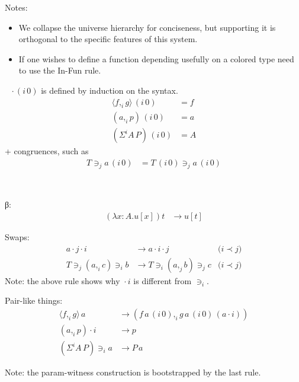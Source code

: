 \documentclass{PaperTools/latex/llncs}
\newcommand\CP[3]{(#2,_{#1} #3)}
\newcommand\param[1]{\!\cdot\!#1}
\newcommand\op[1]{∋_{#1}}
\newcommand\ip[3]{Σ^{#1} {#2}\,{#3}}
\newcommand\fp[3]{⟨#2 ,_{#1} #3⟩}
\newcommand\mor[2]{{#1}\,{#2}}
\newcommand\proj[2]{\mor{#2}{(#1\,0)}}
\newcommand\projp[2]{\proj{#1}{(#2)}}
\newcommand\comment[1]{}
\begin{document}
Notes:

\begin{itemize}
\item We collapse the universe hierarchy for conciseness, but
  supporting it is orthogonal to the specific features of this system.
\item If one wishes to define a function depending usefully on a colored type
  need to use the {\sc In-Fun} rule.
\end{itemize}

\begin{definition}[Projection]~
  $\proj i \cdot$ is defined by induction on the syntax.
\begin{align*}
    \proj i {\fp i f g} & = f \\
  \proj i {(a,_i p)} &= a \\
  \projp i {\ip i A P} &= A
\end{align*}
+ congruences, such as
\begin{align*}
  \proj i {T \op j a} &= {\proj i T \op j \proj i a}
\end{align*}
\end{definition}


\comment{
\begin{definition}[Normal forms and neutral terms]~
  \begin{align*}
    \mathsf{Nf} ∋ u,v,A,B & \coloneqq
      U \mid λx:A. t \mid (x:A) → B \\
      & \mid \CP i u v \mid \fp i u v \\
      & \mid {(\ip {i₀} A B)} \op {i₁} {u_1 \cdots} \op {i_n} {u_n} &\quad \text{($i₀ \prec i₁ \prec \ldots \prec i_n$)} \\
      & \mid s \param {i₀} \cdots \param {i_{n-1}}                  &\quad \text{($i₀ \prec   < \ldots \prec i_{n-1}$)}
    \\
    \mathsf{Ne} ∋ s & \coloneqq x \mid s \, u
  \end{align*}
\end{definition}
}
\begin{definition}~

β:
\begin{align*}
  (λx:A. u[x]) t &→ u[t]
\end{align*}

Swaps:
\begin{align*}
  a \param j \param i &→ a \param i \param j             &\text{($i \prec j$)} \\
  T \op j \CP i a c \op i b &→ T \op i \CP j a b \op j c &\text{($i \prec j$)}
\end{align*}
Note: the above rule shows why ${} \param i {}$ is different from $\op i {}$.

Pair-like things:
\begin{align*}
  {\fp i f g} \, a      &→ (f\,{\proj i a} ,_i g\,{\proj i a}\,{(a \param i)}) \\
  {(a,_i p)} \param i   &→ p \\
  {(\ip i A P)} \op i a &→ P\,a
\end{align*}

Note: the param-witness construction is bootstrapped by the last rule.

\end{definition}
\end{document}
